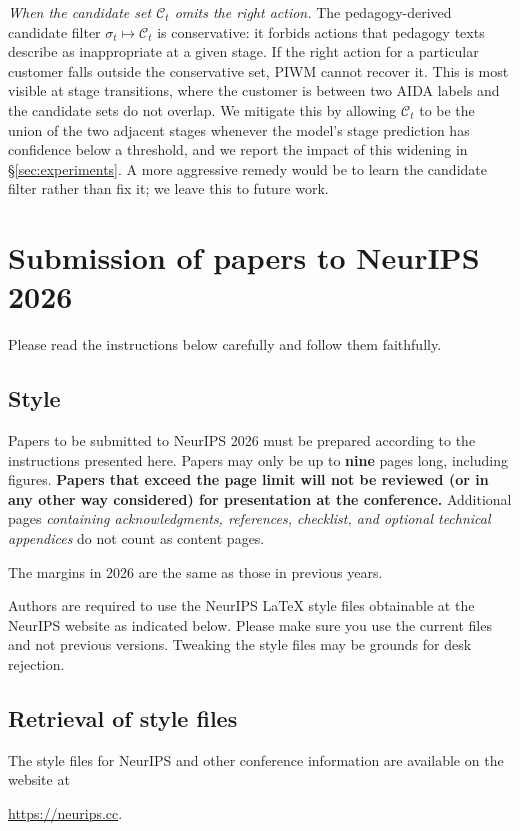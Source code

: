 \documentclass{article}
\begin{document}
\textit{When the candidate set $\mathcal{C}_t$ omits the right action.}
The pedagogy-derived candidate filter $\sigma_t \mapsto \mathcal{C}_t$ is conservative: it forbids actions that pedagogy texts describe as inappropriate at a given stage. If the right action for a particular customer falls outside the conservative set, PIWM cannot recover it. This is most visible at stage transitions, where the customer is between two AIDA labels and the candidate sets do not overlap. We mitigate this by allowing $\mathcal{C}_t$ to be the union of the two adjacent stages whenever the model's stage prediction has confidence below a threshold, and we report the impact of this widening in §\ref{sec:experiments}. A more aggressive remedy would be to learn the candidate filter rather than fix it; we leave this to future work.

\section{Submission of papers to NeurIPS 2026}


Please read the instructions below carefully and follow them faithfully.


\subsection{Style}


Papers to be submitted to NeurIPS 2026 must be prepared according to the
instructions presented here. Papers may only be up to {\bf nine} pages long, including figures. \textbf{Papers that exceed the page limit will not be reviewed (or in any other way considered) for presentation at the conference.}
Additional pages \emph{containing acknowledgments, references, checklist, and optional technical appendices} do not count as content pages. 


The margins in 2026 are the same as those in previous years.


Authors are required to use the NeurIPS \LaTeX{} style files obtainable at the NeurIPS website as indicated below. Please make sure you use the current files and not previous versions. Tweaking the style files may be grounds for desk rejection.


\subsection{Retrieval of style files}


The style files for NeurIPS and other conference information are available on the website at
\begin{center}
  \url{https://neurips.cc}.
\end{center}
\end{document}
